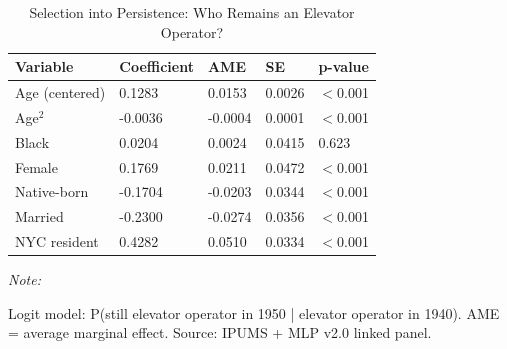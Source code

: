 \begin{table}[!h]
\centering
\caption{Selection into Persistence: Who Remains an Elevator Operator?}
\label{tab:selection_logit}
\centering
\begin{threeparttable}
\begin{tabular}[t]{lllll}
\toprule
Variable & Coefficient & AME & SE & p-value\\
\midrule
Age (centered) & 0.1283 & 0.0153 & 0.0026 & $<$0.001\\
Age$^2$ & -0.0036 & -0.0004 & 0.0001 & $<$0.001\\
Black & 0.0204 & 0.0024 & 0.0415 & 0.623\\
Female & 0.1769 & 0.0211 & 0.0472 & $<$0.001\\
Native-born & -0.1704 & -0.0203 & 0.0344 & $<$0.001\\
\addlinespace
Married & -0.2300 & -0.0274 & 0.0356 & $<$0.001\\
NYC resident & 0.4282 & 0.0510 & 0.0334 & $<$0.001\\
\bottomrule
\end{tabular}
\begin{tablenotes}
\item \textit{Note: } 
\item Logit model: P(still elevator operator in 1950 | elevator operator in 1940). AME = average marginal effect. Source: IPUMS + MLP v2.0 linked panel.
\end{tablenotes}
\end{threeparttable}
\end{table}

